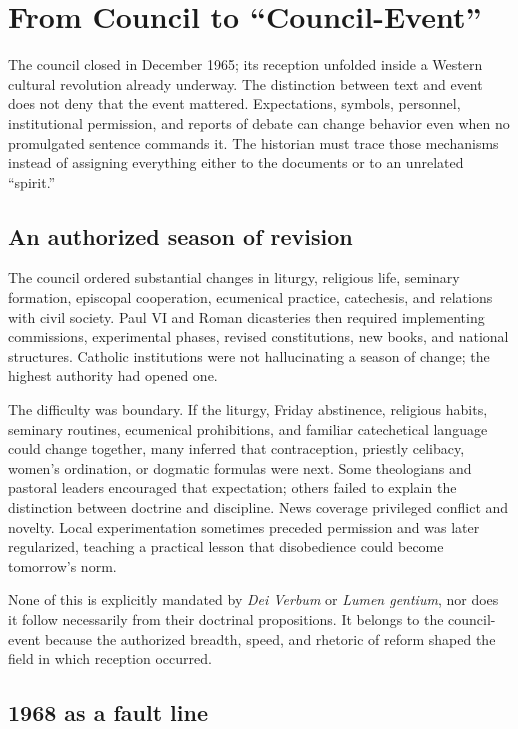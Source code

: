 \section{From Council to “Council-Event”}

The council closed in December 1965; its reception unfolded inside a Western cultural revolution already underway. The distinction between text and event does not deny that the event mattered. Expectations, symbols, personnel, institutional permission, and reports of debate can change behavior even when no promulgated sentence commands it. The historian must trace those mechanisms instead of assigning everything either to the documents or to an unrelated “spirit.”

\subsection{An authorized season of revision}

The council ordered substantial changes in liturgy, religious life, seminary formation, episcopal cooperation, ecumenical practice, catechesis, and relations with civil society. Paul VI and Roman dicasteries then required implementing commissions, experimental phases, revised constitutions, new books, and national structures. Catholic institutions were not hallucinating a season of change; the highest authority had opened one.

The difficulty was boundary. If the liturgy, Friday abstinence, religious habits, seminary routines, ecumenical prohibitions, and familiar catechetical language could change together, many inferred that contraception, priestly celibacy, women's ordination, or dogmatic formulas were next. Some theologians and pastoral leaders encouraged that expectation; others failed to explain the distinction between doctrine and discipline. News coverage privileged conflict and novelty. Local experimentation sometimes preceded permission and was later regularized, teaching a practical lesson that disobedience could become tomorrow's norm.

None of this is explicitly mandated by \emph{Dei Verbum} or \emph{Lumen gentium}, nor does it follow necessarily from their doctrinal propositions. It belongs to the council-event because the authorized breadth, speed, and rhetoric of reform shaped the field in which reception occurred.

\subsection{1968 as a fault line}

